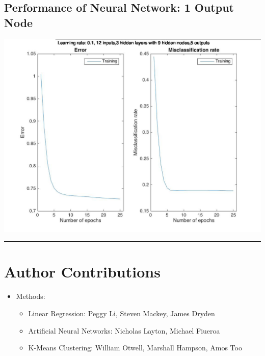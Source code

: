 \documentclass[12pt]{article}
\newcommand{\horizontalLine}{
	\begin{center}
		\hrule width 1.0\textwidth
	\end{center}
}
\begin{document}
\subsection{Performance of Neural Network: 1 Output Node}
\label{subsec:annBestPerformance}
\includegraphics[scale=0.3]{images/ann/bestRun}

\horizontalLine
\section{Author Contributions}
\label{sec:authorContributions}
\begin{itemize}
    \item Methods:
    \begin{itemize}
        \item Linear Regression: Peggy Li, Steven Mackey, James Dryden
        \item Artificial Neural Networks: Nicholas Layton, Michael Fiueroa
        \item K-Means Clustering: William Otwell, Marshall Hampson, Amos Too
    \end{itemize}
\end{itemize}
\end{document}
